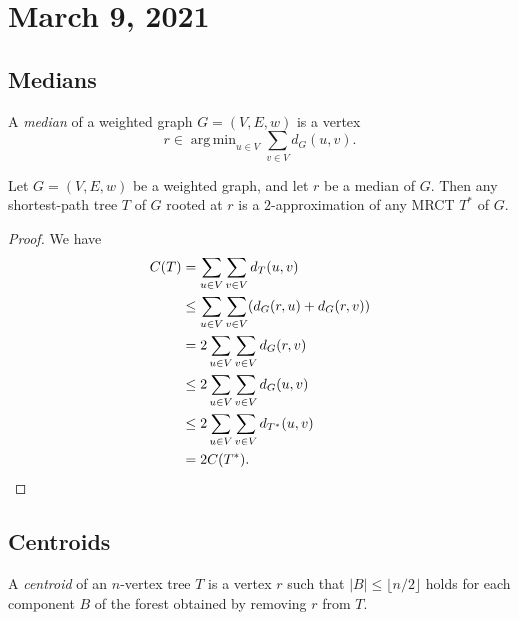 \documentclass[11pt]{article}
\DeclareMathOperator*{\argmin}{arg \, min}
\begin{document}
\section{March 9, 2021}
\subsection{Medians}
A \emph{median} of a weighted graph $G = (V, E, w)$ is a vertex
\begin{equation*}
  r \in \argmin_{u \in V} \sum_{v \in V} d_G(u, v).
\end{equation*}

\begin{theorem}
  Let $G = (V, E, w)$ be a weighted graph, and let $r$ be a median of $G$.
  Then any shortest-path tree $T$ of $G$ rooted at $r$ is a $2$-approximation of any MRCT $T^*$ of $G$.
\end{theorem}
\begin{proof}
  We have
  \begin{align*}
    C(T)
    &= \sum_{u \in V} \sum_{v \in V} d_T(u, v) \\
    &\leq \sum_{u \in V} \sum_{v \in V} (d_G(r, u) + d_G(r, v)) \\
    &= 2 \sum_{u \in V} \sum_{v \in V} d_G(r, v) \\
    &\leq 2 \sum_{u \in V} \sum_{v \in V} d_G(u, v) \\
    &\leq 2 \sum_{u \in V} \sum_{v \in V} d_{T^*}(u, v) \\
    &= 2C(T^*).
    \qedhere
  \end{align*}
\end{proof}

\subsection{Centroids}
A \emph{centroid} of an $n$-vertex tree $T$ is a vertex $r$ such that $|B| \leq \lfloor n/2 \rfloor$ holds for each component $B$ of the forest obtained by removing $r$ from $T$.
\end{document}
